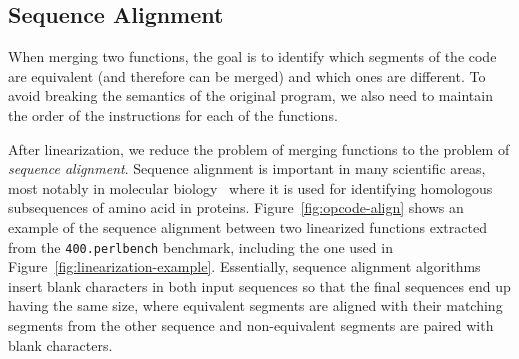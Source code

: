 

\subsection{Sequence Alignment}

When merging two functions, the goal is to identify which segments of the code are equivalent (and therefore can be merged) and which ones are different.
To avoid breaking the semantics of the original program, we also need to maintain the order of the instructions for each of the functions.

After linearization, we reduce the problem of merging functions to the problem of \textit{sequence alignment}. Sequence alignment is important in many scientific areas, most notably in molecular biology~\cite{needleman70,smith81,carrillo88,wang94} where it is used for identifying homologous subsequences of amino acid in proteins.
Figure~\ref{fig:opcode-align} shows an example of
the sequence alignment between two linearized functions extracted from the \texttt{400.perlbench} benchmark, including the one used in
Figure~\ref{fig:linearization-example}.
Essentially, sequence alignment algorithms insert blank characters in both input sequences so that
the final sequences end up having the same size, where equivalent segments are aligned with their matching segments from the other sequence
and non-equivalent segments are paired with blank characters.

